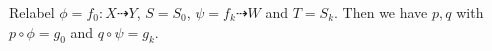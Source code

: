 Relabel $\phi=f_{0}:X \dashrightarrow Y$, $S=S_{0}$, $\psi=f_{k}\dashrightarrow W$ and $T=S_{k}$. Then we have $p,q$ with $p \circ \phi=g_{0}$ and $q \circ \psi =g_{k}$.



%	
%

